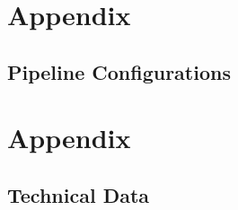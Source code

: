 


%
%
%

\chapter{Appendix}
\vspace{-2cm}
\section*{Pipeline Configurations}
\clearpage

\clearpage
\chapter{Appendix}
\vspace{-2cm}
\section*{Technical Data}
\clearpage

%






%

